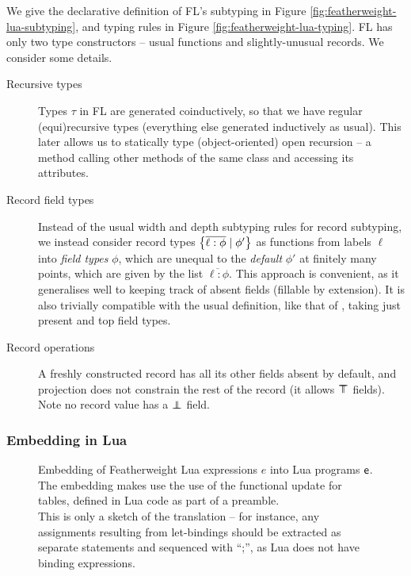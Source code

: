 We give the declarative definition of FL's subtyping in Figure \ref{fig:featherweight-lua-subtyping}, and typing rules in Figure \ref{fig:featherweight-lua-typing}.
FL has only two type constructors -- usual functions and slightly-unusual records. We consider some details.

\begin{description}
    \item[Recursive types] Types $\tau$ in FL are generated coinductively, so that we have regular (equi)recursive types (everything else generated inductively as usual). This later allows us to statically type (object-oriented) open recursion -- a method calling other methods of the same class and accessing its attributes.
    \item[Record field types] Instead of the usual width and depth subtyping rules for record subtyping, we instead consider record types $\flrec{\overline{\ell : \phi} \mid \phi'}$ as functions from labels $\ell$ into \emph{field types} $\phi$, which are unequal to the \emph{default} $\phi'$ at finitely many points, which are given by the list $\overline{\ell : \phi}$. This approach is convenient, as it generalises well to keeping track of absent fields (fillable by extension). It is also trivially compatible with the usual definition, like that of \textcite{tapl}, taking just present and top field types.
    \item[Record operations] A freshly constructed record has all its other fields absent by default, and projection does not constrain the rest of the record (it allows $\top \!\!\!\! \top$ fields). Note no record value has a $\bot \!\!\!\! \bot$ field.
\end{description}

\subsubsection{Embedding in Lua}

\begin{figure}
    \centering
    
    \caption{Embedding of Featherweight Lua expressions $e$ into Lua programs $\textsf{e}$. The embedding makes use the use of the functional \textsf{update} for tables, defined in Lua code as part of a preamble. \\
    This is only a sketch of the translation -- for instance, any assignments resulting from let-bindings should be extracted as separate statements and sequenced with \enquote{;}, as Lua does not have binding expressions.}
    \label{fig:featherweight-lua-embedding}
\end{figure}


